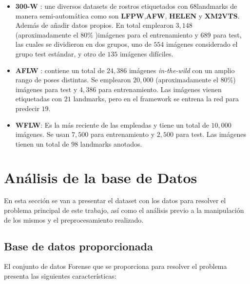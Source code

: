                 \begin{itemize}
                    \item \textbf{300-W} : une diversos datasets de rostros etiquetados con \textbf{$68$}landmarks de manera semi-automática como son \textbf{LFPW},\textbf{AFW}, \textbf{HELEN} y \textbf{XM2VTS}. Además de añadir datos propios. En total emplearon $3,148$ (aproximadamente el $80 \%$ )imágenes para el entrenamiento y $689$ para test, las cuales se dividieron en dos grupos, uno de $554$ imágenes considerado el grupo test estándar, y otro de $135$ imágenes difíciles.
                    \item \textbf{AFLW} : contiene un total de $24,386$ imágenes \textit{in-the-wild} con un amplio rango de poses distintas. Se emplearon $20,000$ (aproximadamente el $80 \%$) imágenes para test y $4,386$ para entrenamiento. Las imágenes vienen etiquetadas con $21$ landmarks, pero en el framework se entrena la red para predecir \textbf{$19$}.
                    \item \textbf{WFLW}: Es la más reciente de las empleadas y tiene un total de $10,000$ imágenes. Se usan $7,500$ para entrenamiento y $2,500$ para test. Las imágenes tienen un total de \textbf{$98$} landmarks anotados.
                \end{itemize}

\section{Análisis de la base de Datos}
    \noindent En esta sección se van a presentar el dataset con los datos para resolver el problema principal de este trabajo, así como el análisis previo a la manipulación de los mismos y el preprocesamiento realizado.

    \subsection{Base de datos proporcionada}
        \noindent El conjunto de datos Forense que se proporciona para resolver el problema presenta las siguientes características: 

